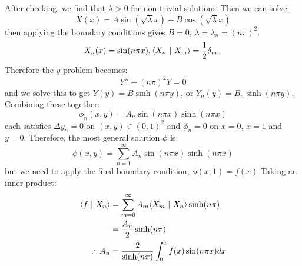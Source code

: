 \documentclass[../Main.tex]{subfiles}
\begin{document}
After checking, we find that $\lambda > 0$ for non-trivial solutions. Then we can solve:
\begin{equation*}
    X(x) = A\sin(\sqrt{\lambda}x) + B\cos(\sqrt{\lambda}x)
\end{equation*}
then applying the boundary conditions gives $B = 0$, $\lambda = \lambda_n = (n\pi)^2$.
\begin{equation*}
    X_n(x) = \sin(n\pi x), \langle X_n~\vert~X_m\rangle = \frac12 \delta_{mn}
\end{equation*}
Therefore the $y$ problem becomes:
\begin{equation*}
    Y'' - (n\pi)^2 Y = 0
\end{equation*}
and we solve this to get $Y(y) = B \sinh(n\pi y)$, or $Y_n(y) = B_n \sinh(n\pi y)$. Combining these together:
\begin{equation*}
    \phi_n(x, y) = A_n \sin(n\pi x) \sinh(n\pi x)
\end{equation*}
each satisfies $\Delta y_n = 0$ on $(x, y) \in (0,1)^2$ and $\phi_n = 0$ on $x = 0$, $x = 1$ and $y = 0$. Therefore, the most general solution $\phi$ is:
\begin{equation*}
    \phi(x, y) = \sum_{n = 1}^\infty A_n \sin(n\pi x) \sinh(n\pi x)
\end{equation*}
but we need to apply the final boundary condition, $\phi(x, 1) = f(x)$ Taking an inner product:
\begin{align*}
    \langle f~\vert~X_n\rangle &= \sum_{m=0}^{\infty} A_m \langle X_m~\vert~X_n\rangle \sinh(n\pi) \\
    &= \frac{A_n}{2}\sinh(n\pi) \\
    \therefore A_n &= \frac{2}{\sinh(n\pi)} \int_{0}^{1} f(x) \sin(n\pi x) dx 
\end{align*}
\end{document}
